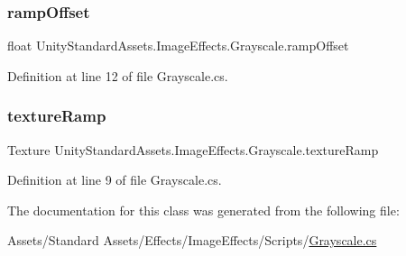 \subsubsection{\texorpdfstring{ramp\+Offset}{rampOffset}}
{\footnotesize\ttfamily float Unity\+Standard\+Assets.\+Image\+Effects.\+Grayscale.\+ramp\+Offset}



Definition at line 12 of file Grayscale.\+cs.

\mbox{\label{class_unity_standard_assets_1_1_image_effects_1_1_grayscale_a0eb120d0884c76cd7c0a7e2c0d455c37}} 
\subsubsection{\texorpdfstring{texture\+Ramp}{textureRamp}}
{\footnotesize\ttfamily Texture Unity\+Standard\+Assets.\+Image\+Effects.\+Grayscale.\+texture\+Ramp}



Definition at line 9 of file Grayscale.\+cs.



The documentation for this class was generated from the following file\+:\begin{DoxyCompactItemize}
\item 
Assets/\+Standard Assets/\+Effects/\+Image\+Effects/\+Scripts/\mbox{\hyperlink{_grayscale_8cs}{Grayscale.\+cs}}\end{DoxyCompactItemize}
